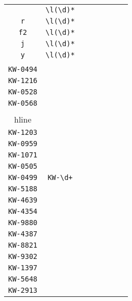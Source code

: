 \begin{longtable}{cccccccc}
\begin{tabular}{ll}
    \verb|s| & \verb|\l(\d)*|\\
\verb|r| & \verb|\l(\d)*|\\
\verb|f2| & \verb|\l(\d)*|\\
\verb|j| & \verb|\l(\d)*|\\
\verb|y| & \verb|\l(\d)*|
\end{tabular}
\\\midrule 
\begin{tabular}{l}
    \verb|KW-0497|\\
\verb|KW-0494|\\
\verb|KW-1216|\\
\verb|KW-0528|\\
\verb|KW-0568|\\
\\hline\\
\verb|KW-1203|\\
\verb|KW-0959|\\
\verb|KW-1071|\\
\verb|KW-0505|\\
\verb|KW-0499|
\end{tabular}

&
\verb|KW-\d+|
&

\begin{tabular}{l}
    \verb|KW-\d\d\d\d|\\
\verb|KW-5188|\\
\verb|KW-4639|\\
\verb|KW-4354|\\
\verb|KW-9880|\\
\verb|KW-4387|
\end{tabular}

&

\begin{tabular}{l}
    \verb|KW-\d\d\d\d|\\
\verb|KW-8821|\\
\verb|KW-9302|\\
\verb|KW-1397|\\
\verb|KW-5648|\\
\verb|KW-2913|
\end{tabular}

&


\end{longtable}
